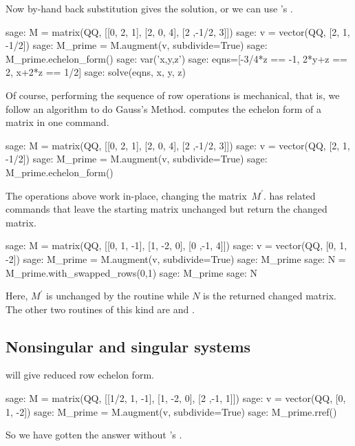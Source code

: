 Now by-hand back substitution gives the solution, or we can 
use \Sage's .
\begin{sagecommandline}
sage: M = matrix(QQ, [[0, 2, 1], [2, 0, 4], [2 ,-1/2, 3]])
sage: v = vector(QQ, [2, 1, -1/2])                        
sage: M_prime = M.augment(v, subdivide=True)
sage: M_prime.echelon_form()              
sage: var('x,y,z')
sage: eqns=[-3/4*z == -1, 2*y+z == 2, x+2*z == 1/2]
sage: solve(eqns, x, y, z)
\end{sagecommandline}

Of course, performing the sequence of row operations
is mechanical, that is, we follow an algorithm to do Gauss's Method. 
\Sage{} computes the echelon form of a 
matrix in one command.
\begin{sagecommandline}
sage: M = matrix(QQ, [[0, 2, 1], [2, 0, 4], [2 ,-1/2, 3]])
sage: v = vector(QQ, [2, 1, -1/2])                        
sage: M_prime = M.augment(v, subdivide=True)              
sage: M_prime.echelon_form()                                            
\end{sagecommandline}

The operations above
work in-place, changing the matrix~$M^\prime$.
\Sage{} has related commands that leave the starting matrix unchanged
but return the changed matrix.
\begin{sagecommandline}
sage: M = matrix(QQ, [[0, 1, -1], [1, -2, 0], [0 ,-1, 4]])
sage: v = vector(QQ, [0, 1, -2])
sage: M_prime = M.augment(v, subdivide=True) 
sage: M_prime
sage: N = M_prime.with_swapped_rows(0,1)
sage: M_prime
sage: N      
\end{sagecommandline}
Here, $M^\prime$ is unchanged by the routine while $N$ is the returned 
changed matrix.
The other two routines of this kind are  
and .




\subsection{Nonsingular and singular systems}
\Sage{} will give reduced row echelon form.
\begin{sagecommandline}
sage: M = matrix(QQ, [[1/2, 1, -1], [1, -2, 0], [2 ,-1, 1]])
sage: v = vector(QQ, [0, 1, -2])
sage: M_prime = M.augment(v, subdivide=True) 
sage: M_prime.rref()
\end{sagecommandline}
So we have gotten the answer without \Sage's .

